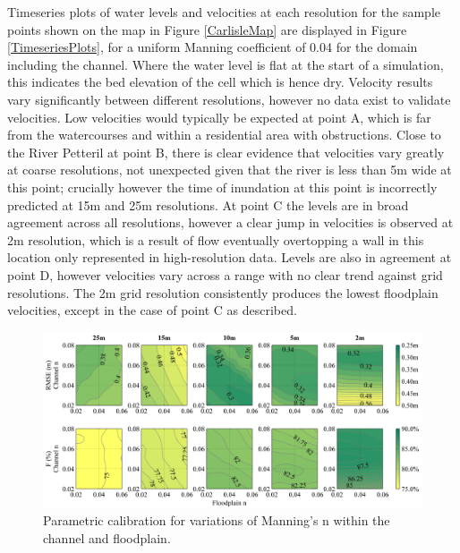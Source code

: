 Timeseries plots of water levels and velocities at each resolution for the sample points shown on the map in Figure \ref{CarlisleMap} are displayed in Figure \ref{TimeseriesPlots}, for a uniform Manning coefficient of 0.04 for the domain including the channel. Where the water level is flat at the start of a simulation, this indicates the bed elevation of the cell which is hence dry. Velocity results vary significantly between different resolutions, however no data exist to validate velocities. Low velocities would typically be expected at point A, which is far from the watercourses and within a residential area with obstructions. Close to the River Petteril at point B, there is clear evidence that velocities vary greatly at coarse resolutions, not unexpected given that the river is less than 5m wide at this point; crucially however the time of inundation at this point is incorrectly predicted at 15m and 25m resolutions.  At point C the levels are in broad agreement across all resolutions, however a clear jump in velocities is observed at 2m resolution, which is a result of flow eventually overtopping a wall in this location only represented in high-resolution data. Levels are also in agreement at point D, however velocities vary across a range with no clear trend against grid resolutions. The 2m grid resolution consistently produces the lowest floodplain velocities, except in the case of point C as described.

\begin{figure}[tpb]
	\centering
	\includegraphics[width=1.0\textwidth]{carlisle-figures/Figure7.png}
	\caption{Parametric calibration for variations of Manning's n within the channel and floodplain.}
	\label{Calibration}
\end{figure}

